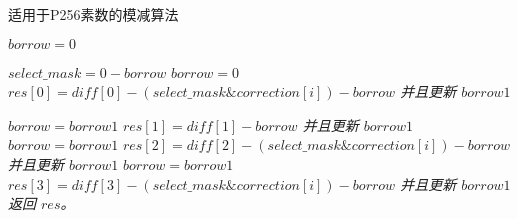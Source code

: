 \documentclass{ctexart} %
\begin{document}
\begin{algorithm}[H]
    \caption{\kaishu 适用于P256素数的模减算法} %
    \label{alg2}
    \LinesNumbered  %
    \emph {$borrow=0$ \;}
    
    \emph {$select\_mask=0-borrow$ \hspace{2em}  }
    \emph {$borrow=0$ }\;
    \emph {$res[0]=diff[0]-(select\_mask \& correction[i])-borrow$ 并且更新 $borrow1$ }\;
    
    \emph {$borrow=borrow1$}\;
    \emph {$res[1]=diff[1]-borrow$ 并且更新 $borrow1$ }\;
    \emph {$borrow=borrow1$}\;
    \emph {$res[2]=diff[2]-(select\_mask \& correction[i])-borrow$ 并且更新 $borrow1$ }\;
    \emph {$borrow=borrow1$}\;
    \emph {$res[3]=diff[3]-(select\_mask \& correction[i])-borrow$ 并且更新 $borrow1$ }\;
    \emph {返回 $res$。}
\end{algorithm}
\end{document}
